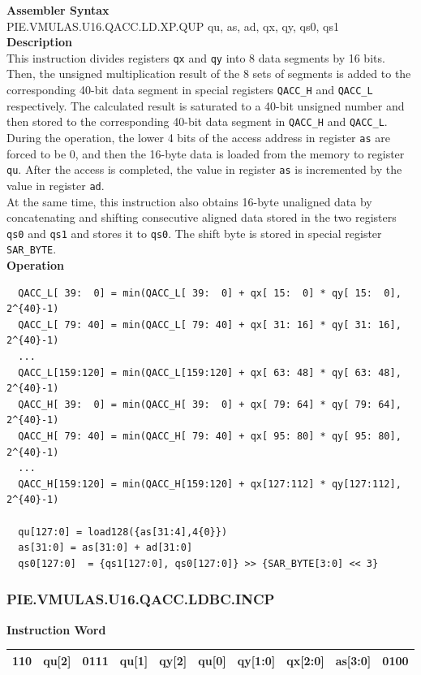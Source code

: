 \textbf{Assembler Syntax} \\
PIE.VMULAS.U16.QACC.LD.XP.QUP qu, as, ad, qx, qy, qs0, qs1 \\
\textbf{Description} \\
This instruction divides registers \lstinline{qx} and \lstinline{qy} into 8 data segments by 16 bits. Then, the unsigned multiplication result of the 8 sets of segments is added to the corresponding 40-bit data segment in special registers \lstinline{QACC_H} and \lstinline{QACC_L} respectively. The calculated result is saturated to a 40-bit unsigned number and then stored to the corresponding 40-bit data segment in \lstinline{QACC_H} and \lstinline{QACC_L}.\\
During the operation, the lower 4 bits of the access address in register \lstinline{as} are forced to be 0, and then the 16-byte data is loaded from the memory to register \lstinline{qu}. After the access is completed, the value in register \lstinline{as} is incremented by the value in register \lstinline{ad}.\\
At the same time, this instruction also obtains 16-byte unaligned data by concatenating and shifting consecutive aligned data stored in the two registers \lstinline{qs0} and \lstinline{qs1} and stores it to \lstinline{qs0}. The shift byte is stored in special register \lstinline{SAR_BYTE}.\\
\textbf{Operation}
\begin{lstlisting}
  QACC_L[ 39:  0] = min(QACC_L[ 39:  0] + qx[ 15:  0] * qy[ 15:  0], 2^{40}-1)
  QACC_L[ 79: 40] = min(QACC_L[ 79: 40] + qx[ 31: 16] * qy[ 31: 16], 2^{40}-1)
  ...
  QACC_L[159:120] = min(QACC_L[159:120] + qx[ 63: 48] * qy[ 63: 48], 2^{40}-1)
  QACC_H[ 39:  0] = min(QACC_H[ 39:  0] + qx[ 79: 64] * qy[ 79: 64], 2^{40}-1)
  QACC_H[ 79: 40] = min(QACC_H[ 79: 40] + qx[ 95: 80] * qy[ 95: 80], 2^{40}-1)
  ...
  QACC_H[159:120] = min(QACC_H[159:120] + qx[127:112] * qy[127:112], 2^{40}-1)

  qu[127:0] = load128({as[31:4],4{0}})
  as[31:0] = as[31:0] + ad[31:0]
  qs0[127:0]  = {qs1[127:0], qs0[127:0]} >> {SAR_BYTE[3:0] << 3}
\end{lstlisting}

\newpage
\subsubsection{PIE.VMULAS.U16.QACC.LDBC.INCP}\label{instruction:PIEVMULASU16QACCLDBCINCP}
\setlength\tabcolsep{6pt}
\textbf{Instruction Word} \\
\begin{tabular}{|c|c|c|c|c|c|c|c|c|c|}
	\hline
	110 & qu[2] & 0111 & qu[1] & qy[2] & qu[0] & qy[1:0] & qx[2:0] & as[3:0] & 0100 \\
	\hline
\end{tabular}

